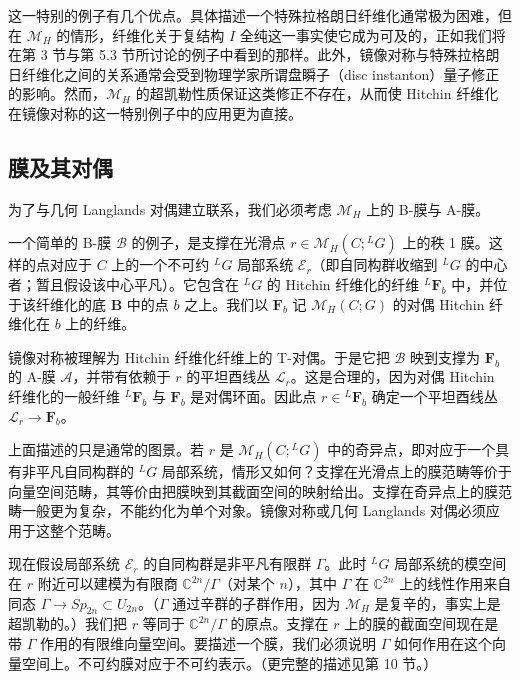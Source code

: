 \documentclass[11pt,a4paper]{article}
\begin{document}
这一特别的例子有几个优点。具体描述一个特殊拉格朗日纤维化通常极为困难，但在 $\mathcal{M}_H$ 的情形，纤维化关于复结构 $I$ 全纯这一事实使它成为可及的，正如我们将在第 3 节与第 5.3 节所讨论的例子中看到的那样。此外，镜像对称与特殊拉格朗日纤维化之间的关系通常会受到物理学家所谓盘瞬子（disc instanton）量子修正的影响。然而，$\mathcal{M}_H$ 的超凯勒性质保证这类修正不存在，从而使 Hitchin 纤维化在镜像对称的这一特别例子中的应用更为直接。

\subsection{膜及其对偶}

为了与几何 Langlands 对偶建立联系，我们必须考虑 $\mathcal{M}_H$ 上的 B-膜与 A-膜。

一个简单的 B-膜 $\mathcal{B}$ 的例子，是支撑在光滑点 $r\in\mathcal{M}_H(C;{}^{L}G)$ 上的秩 1 膜。这样的点对应于 $C$ 上的一个不可约 ${}^{L}G$ 局部系统 $\mathcal{E}_r$（即自同构群收缩到 ${}^{L}G$ 的中心者；暂且假设该中心平凡）。它包含在 ${}^{L}G$ 的 Hitchin 纤维化的纤维 ${}^{L}\boldsymbol{F}_b$ 中，并位于该纤维化的底 $\boldsymbol{B}$ 中的点 $b$ 之上。我们以 $\boldsymbol{F}_b$ 记 $\mathcal{M}_H(C;G)$ 的对偶 Hitchin 纤维化在 $b$ 上的纤维。


镜像对称被理解为 Hitchin 纤维化纤维上的 T-对偶。于是它把 $\mathcal{B}$ 映到支撑为 $\boldsymbol{F}_b$ 的 A-膜 $\mathcal{A}$，并带有依赖于 $r$ 的平坦酉线丛 $\mathcal{L}_r$。这是合理的，因为对偶 Hitchin 纤维化的一般纤维 ${}^{L}\boldsymbol{F}_b$ 与 $\boldsymbol{F}_b$ 是对偶环面。因此点 $r\in{}^{L}\boldsymbol{F}_b$ 确定一个平坦酉线丛 $\mathcal{L}_r\to\boldsymbol{F}_b$。

上面描述的只是通常的图景。若 $r$ 是 $\mathcal{M}_H(C;{}^{L}G)$ 中的奇异点，即对应于一个具有非平凡自同构群的 ${}^{L}G$ 局部系统，情形又如何？支撑在光滑点上的膜范畴等价于向量空间范畴，其等价由把膜映到其截面空间的映射给出。支撑在奇异点上的膜范畴一般更为复杂，不能约化为单个对象。镜像对称或几何 Langlands 对偶必须应用于这整个范畴。

现在假设局部系统 $\mathcal{E}_r$ 的自同构群是非平凡有限群 $\Gamma$。此时 ${}^{L}G$ 局部系统的模空间在 $r$ 附近可以建模为有限商 $\mathbb{C}^{2n}/\Gamma$（对某个 $n$），其中 $\Gamma$ 在 $\mathbb{C}^{2n}$ 上的线性作用来自同态 $\Gamma\to Sp_{2n}\subset U_{2n}$。（$\Gamma$ 通过辛群的子群作用，因为 $\mathcal{M}_H$ 是复辛的，事实上是超凯勒的。）我们把 $r$ 等同于 $\mathbb{C}^{2n}/\Gamma$ 的原点。支撑在 $r$ 上的膜的截面空间现在是带 $\Gamma$ 作用的有限维向量空间。要描述一个膜，我们必须说明 $\Gamma$ 如何作用在这个向量空间上。不可约膜对应于不可约表示。（更完整的描述见第 10 节。）
\end{document}
